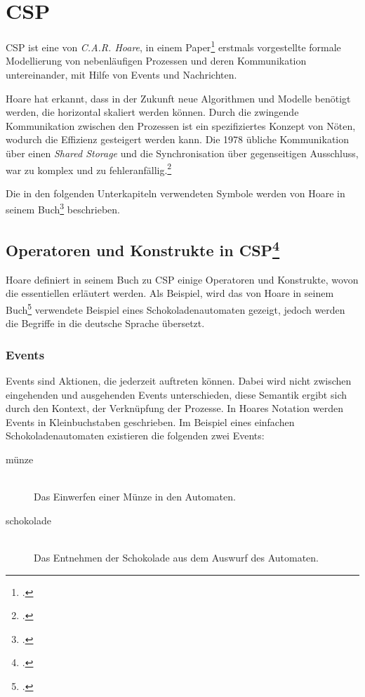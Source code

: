 \section{\acl{CSP}}
\acf{CSP} ist eine von \textit{C.A.R. Hoare}, in einem Paper\footcite{CSP} erstmals vorgestellte formale Modellierung von nebenläufigen Prozessen und deren Kommunikation untereinander, mit Hilfe von Events und Nachrichten.

Hoare hat erkannt, dass in der Zukunft neue Algorithmen und Modelle benötigt werden, die horizontal skaliert werden können. Durch die zwingende Kommunikation zwischen den Prozessen ist ein spezifiziertes Konzept von Nöten, wodurch die Effizienz gesteigert werden kann. Die 1978 übliche Kommunikation über einen \textit{Shared Storage} und die Synchronisation über gegenseitigen Ausschluss, war zu komplex und zu fehleranfällig.\footcite[Introduction]{CSP}

Die in den folgenden Unterkapiteln verwendeten Symbole werden von Hoare in seinem Buch\footcite[Glossary of Symbols]{CSPBOOK} beschrieben.

\subsection[Operatoren und Konstrukte in \acs{CSP}]{Operatoren und Konstrukte in \acs{CSP}\footcite[Siehe][Kap. 1.1]{CSPBOOK}}

Hoare definiert in seinem Buch zu \ac{CSP} einige Operatoren und Konstrukte, wovon die essentiellen erläutert werden. Als Beispiel, wird das von Hoare in seinem Buch\footcite{CSPBOOK} verwendete Beispiel eines Schokoladenautomaten gezeigt, jedoch werden die Begriffe in die deutsche Sprache übersetzt.

\subsubsection{Events}
Events sind Aktionen, die jederzeit auftreten können. Dabei wird nicht zwischen eingehenden und ausgehenden Events unterschieden, diese Semantik ergibt sich durch den Kontext, der Verknüpfung der Prozesse. In Hoares Notation werden Events in Kleinbuchstaben geschrieben.
Im Beispiel eines einfachen Schokoladenautomaten existieren die folgenden zwei Events:

\begin{description}
\item[münze]\hfill \\
Das Einwerfen einer Münze in den Automaten.
\item[schokolade]\hfill \\
Das Entnehmen der Schokolade aus dem Auswurf des Automaten.
\end{description}


